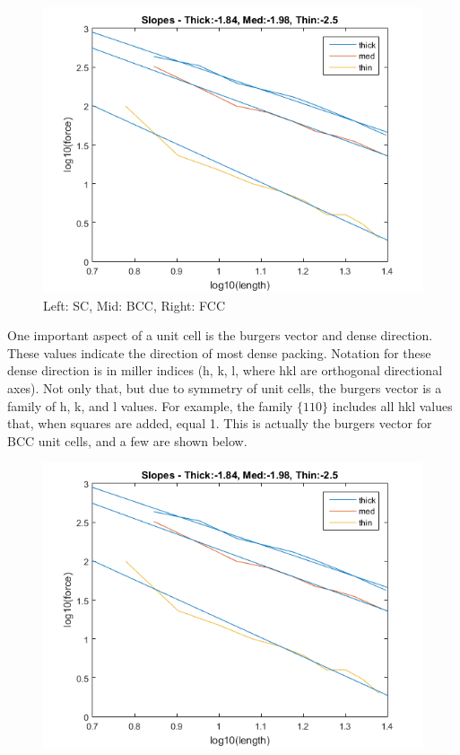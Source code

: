 \documentclass{article}
\begin{document}
\begin{figure}[h]
\begin{minipage}{0.32\textwidth}
	\end{minipage}
	\begin{minipage}{0.32\textwidth}
		\centering
		\includegraphics[scale=.3]{Lab1f1.png}
	\end{minipage}
	\caption{Left: SC, Mid: BCC, Right: FCC}
\end{figure}

One important aspect of a unit cell is the burgers vector and dense direction. These values indicate the direction of most dense packing. Notation for these dense direction is in miller indices (h, k, l, where hkl are orthogonal directional axes). Not only that, but due to symmetry of unit cells, the burgers vector is a family of h, k, and l values. For example, the family $\{1 1 0\}$ includes all hkl values that, when squares are added, equal 1. This is actually the burgers vector for BCC unit cells, and a few are shown below.

\begin{figure}[h]
	\centering
	\includegraphics[scale=.3]{Lab1f1.png}
\end{figure}
\end{document}
